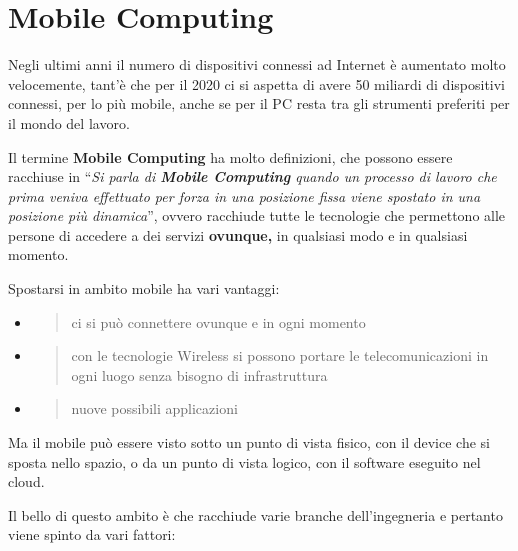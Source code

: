 \section{Mobile Computing}\label{mobile-computing}

Negli ultimi anni il numero di dispositivi connessi ad Internet è
aumentato molto velocemente, tant'è che per il 2020 ci si aspetta di
avere 50 miliardi di dispositivi connessi, per lo più mobile, anche se
per il PC resta tra gli strumenti preferiti per il mondo del lavoro.

Il termine \textbf{Mobile Computing} ha molto definizioni, che possono
essere racchiuse in ``\emph{Si parla di \textbf{Mobile Computing} quando
un processo di lavoro che prima veniva effettuato per forza in una
posizione fissa viene spostato in una posizione più dinamica}'', ovvero
racchiude tutte le tecnologie che permettono alle persone di accedere a
dei servizi \textbf{ovunque,} in qualsiasi modo e in qualsiasi momento.

Spostarsi in ambito mobile ha vari vantaggi:

\begin{itemize}
\item
  \begin{quote}
  ci si può connettere ovunque e in ogni momento
  \end{quote}
\item
  \begin{quote}
  con le tecnologie Wireless si possono portare le telecomunicazioni in
  ogni luogo senza bisogno di infrastruttura
  \end{quote}
\item
  \begin{quote}
  nuove possibili applicazioni
  \end{quote}
\end{itemize}

Ma il mobile può essere visto sotto un punto di vista fisico, con il
device che si sposta nello spazio, o da un punto di vista logico, con il
software eseguito nel cloud.

Il bello di questo ambito è che racchiude varie branche dell'ingegneria
e pertanto viene spinto da vari fattori:

